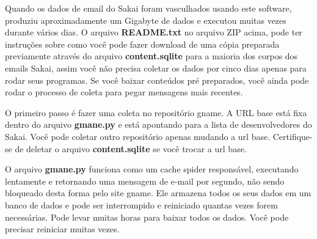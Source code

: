Quando os dados de email do Sakai foram vasculhados usando este software, 
produziu aproximadamente um Gigabyte de dados e executou muitas vezes 
durante vários dias.
O arquivo {\bf README.txt} no arquivo ZIP acima, pode ter instruções sobre
como você pode fazer download de uma cópia preparada previamente através do
arquivo {\bf content.sqlite} para a maioria dos corpos dos emails Sakai, assim
você não precisa coletar os dados por cinco dias apenas para rodar seus programas.
Se você baixar conteúdos pré preparados, você ainda pode rodar o processo de coleta
para pegar mensagens mais recentes.

O primeiro passo é fazer uma coleta no repositório gname. A URL base
está fixa dentro do arquivo {\bf gmane.py} e está apontando para a lista
de desenvolvedores do Sakai. Você pode coletar outro repositório apenas
mudando a url base. Certifique-se de deletar o arquivo {\bf content.sqlite}
se você trocar a url base.

O arquivo {\bf gmane.py} funciona como um cache spider responsável,
executando lentamente e retornando uma mensagem de e-mail por segundo,
não sendo bloqueado desta forma pelo site gname. Ele armazena todos os
seus dados em um banco de dados e pode ser interrompido e reiniciado
quantas vezes forem necessárias. Pode levar muitas horas para baixar
todos os dados. Você pode precisar reiniciar muitas vezes.

